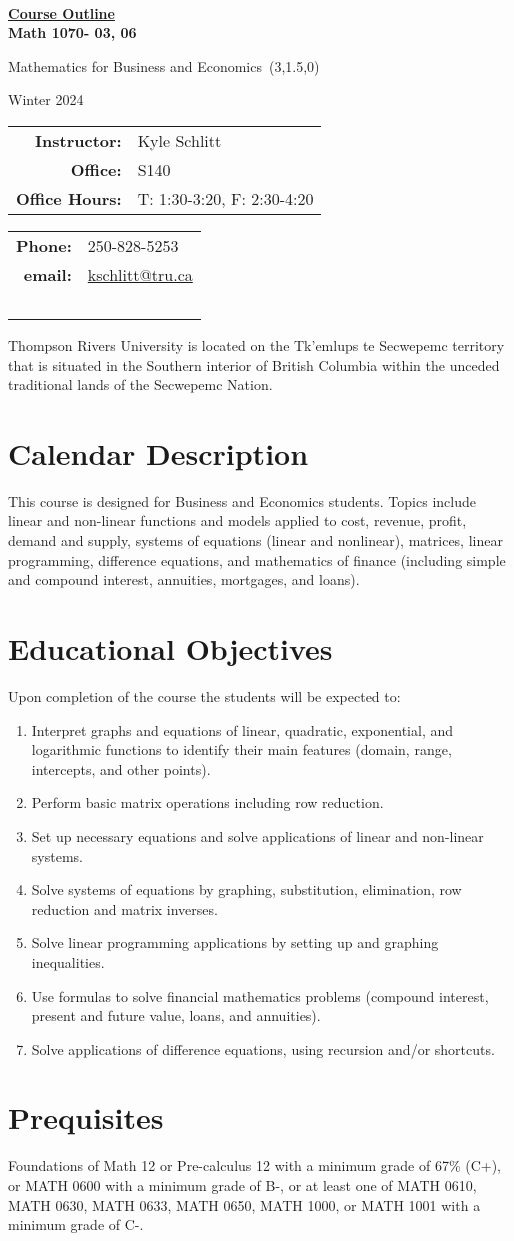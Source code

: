 \documentclass[10pt]{trumathoutline}
\makeatletter
\newcommand{\instructorname}     {Kyle Schlitt}
\newcommand{\instructorphone}    {250-828-5253}
\newcommand{\instructoremail}    {kschlitt@tru.ca}
\newcommand{\instructorofficehrs}{T: 1:30-3:20, F: 2:30-4:20}
\newcommand{\instructorofficerm} {S140}
\newcommand{\coursecode}     	 {Math 1070- 03, 06}
\newcommand{\coursetitle}    	 {Mathematics for Business and Economics}
\newcommand{\coursevectoring}	 {(3,1.5,0)}
\newcommand{\term}           	 {Winter 2024}
\newcommand{\courseprerequisites}{Foundations of Math 12 or Pre-calculus 12 with a minimum grade of 67\% (C+), or MATH 0600 with a minimum grade of B-, or at least one of MATH 0610, MATH 0630, MATH 0633, MATH 0650, MATH 1000, or MATH 1001 with a minimum grade of C-.}
\newcommand{\calendardescription}{
	This course is designed for Business and Economics students. Topics include linear and non-linear functions and models applied to cost, revenue, profit, demand and supply, systems of equations (linear and nonlinear), matrices, linear programming, difference equations, and mathematics of finance (including simple and compound interest, annuities, mortgages, and loans).}
\newcommand{\coursedescription}{
}
\newcommand{\courseobjectives}{
\begin{enumerate}
\item Interpret graphs and equations of linear, quadratic, exponential, and logarithmic functions to identify their main features (domain, range, intercepts, and other points).
\item Perform basic matrix operations including row reduction.
\item Set up necessary equations and solve applications of linear and non-linear systems.
\item Solve systems of equations by graphing, substitution, elimination, row reduction and matrix inverses.
\item Solve linear programming applications by setting up and graphing inequalities.
\item Use formulas to solve financial mathematics problems (compound interest, present and future value, loans, and annuities).
\item Solve applications of difference equations, using recursion and/or shortcuts.	\end{enumerate}
}
\makeatother
\begin{document}
	
	~
	
	\vspace{-1em}
	
	\begin{center}
		\bfseries
		{\Large \underline{Course Outline}}\\[0.5em]
		
		\coursecode
		
		\coursetitle\ \coursevectoring
		
		\term
		
	\end{center}
\begin{tabular}{ r l}
	\textbf{Instructor:}	& \instructorname 	\\
	\textbf{Office:} 		& \instructorofficerm \\
	\textbf{Office Hours:} 	& \instructorofficehrs
\end{tabular}\hfill
\begin{tabular}{ r l}
	 \textbf{Phone:} & \instructorphone\\
	 \textbf{email:} & \href{mailto:\instructoremail}{\instructoremail}\\
	~
\end{tabular}

\vspace{1em}


Thompson Rivers University is located on the Tk’emlups te Secwepemc territory that is situated in the Southern interior of British Columbia within the unceded traditional lands of the Secwepemc Nation.

\section*{Calendar Description}
\calendardescription
	


\section*{Educational Objectives}
Upon completion of the course the students will be expected to:
\courseobjectives

\section*{Prequisites}
\courseprerequisites
\end{document}
